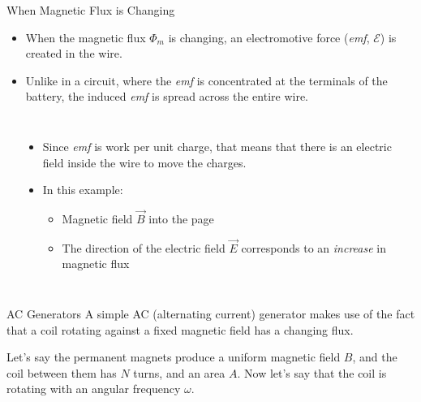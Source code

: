 \documentclass[12pt,aspectratio=169]{beamer}
\begin{document}
\begin{frame}{When Magnetic Flux is Changing}
  \begin{itemize}
  \item When the magnetic flux $\Phi_m$ is changing, an electromotive force
    (\emph{emf}, $\mathcal E$) is created in the wire.
  \item Unlike in a circuit, where the \emph{emf} is concentrated at the
    terminals of the battery, the induced \emph{emf} is spread across the
    entire wire.
  \end{itemize}
  \begin{columns}
    \begin{center}
    \end{center}
    
    \begin{itemize}
    \item Since \emph{emf} is work per unit charge, that means that there is an
      electric field inside the wire to move the charges.
    \item In this example:
      \begin{itemize}
      \item Magnetic field $\vec B$ into the page
      \item The direction of the electric field $\vec E$ corresponds to an
        \emph{increase} in magnetic flux
      \end{itemize}
    \end{itemize}
  \end{columns}
\end{frame}


\begin{frame}{AC Generators}
  A simple AC (alternating current) generator makes use of the fact that a 
  coil rotating against a fixed magnetic field has a changing flux.
  \begin{center}
  \end{center}
  Let's say the permanent magnets produce a uniform magnetic field $B$, and the
  coil between them has $N$ turns, and an area $A$. Now let's say that the coil
  is rotating with an angular frequency $\omega$.
\end{frame}
\end{document}
